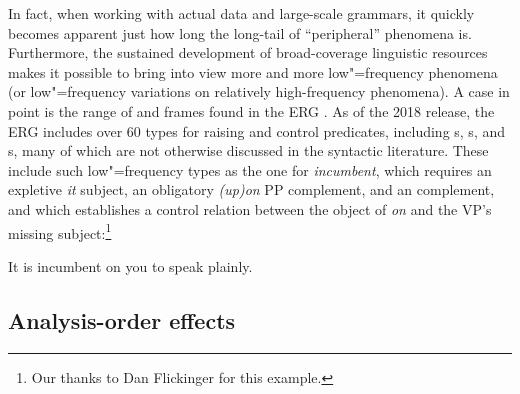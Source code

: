 \documentclass[output=paper
 	        ,biblatex
                ,babelshorthands
                ,newtxmath
                ,draftmode
                ,colorlinks, citecolor=brown
]{langscibook}
\begin{document}
\begin{sloppypar}
In fact, when working with actual data and large-scale grammars,
it quickly becomes apparent just how long the long-tail of ``peripheral'' phenomena is. Furthermore,
the sustained development of broad-coverage linguistic resources makes it possible to bring into
view more and more low"=frequency phenomena (or low"=frequency variations on relatively
high-frequency phenomena). A case in point is the range of  and 
 frames found in the ERG
\citep{Flickinger2000a,Flickinger2011a-u}. As of the 2018 release, the ERG includes over 60 types
for raising and control predicates, including s, s, and s,
many of which are not otherwise discussed in the syntactic literature. These include such
low"=frequency types as the one for \textit{incumbent}, which requires an expletive \textit{it}
subject, an obligatory \textit{(up)on} PP complement, and an  complement,
and which establishes a control relation between the object of \textit{on} and the VP's missing subject:\footnote{%
	Our thanks to Dan Flickinger for this example.
}
\end{sloppypar}

\begin{exe}
\ex\label{cl:incumbent} 
It is incumbent on you to speak plainly.
\end{exe}%
%



\subsection{Analysis-order effects}
\end{document}
